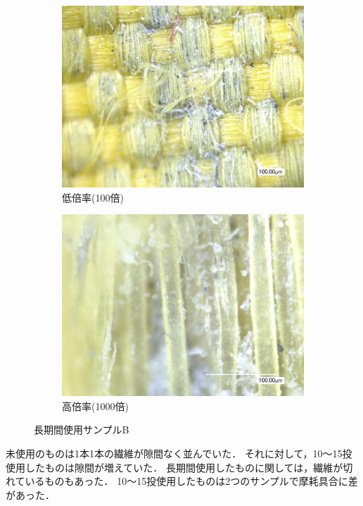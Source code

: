 \documentclass[main]{subfiles}
\begin{document}
\begin{figure}[H]
    \centering
    \begin{subfigure}[htbp]{0.45\linewidth}
        \centering
        \includegraphics[keepaspectratio, width=0.8\linewidth]{figures/縁/カーリングパッド長期低倍率B.jpg}
        \caption{低倍率(100倍)}
        \label{fig:label}
    \end{subfigure}
    \begin{subfigure}[htbp]{0.45\linewidth}
        \centering
        \includegraphics[keepaspectratio, width=0.8\linewidth]{figures/縁/カーリングパッド長期B.jpg}
        \caption{高倍率(1000倍)}
        \label{fig:label}
    \end{subfigure}
    \caption{長期間使用サンプルB}
    \label{fig:5}
\end{figure}


未使用のものは1本1本の繊維が隙間なく並んでいた．
それに対して，10～15投使用したものは隙間が増えていた．
長期間使用したものに関しては，繊維が切れているものもあった．
10～15投使用したものは2つのサンプルで摩耗具合に差があった．
\end{document}
